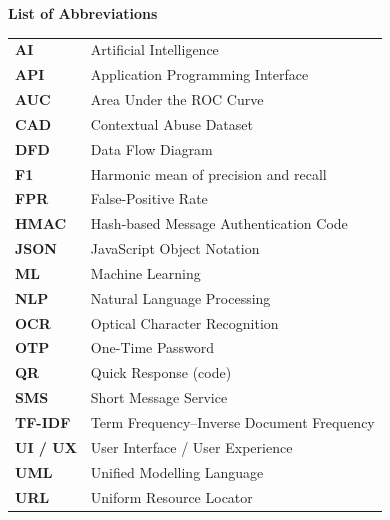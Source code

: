 \newpage
\thispagestyle{plain}
\begin{center}
\textbf {{\Large List of Abbreviations}} \\
\vspace{1pc}
\end{center}
\singlespacing
{\renewcommand{\arraystretch}{1.25}
\begin{tabular}{p{3cm} p{11cm}}
\textbf{AI} & Artificial Intelligence \\
\textbf{API} & Application Programming Interface \\
\textbf{AUC} & Area Under the ROC Curve \\
\textbf{CAD} & Contextual Abuse Dataset \\
\textbf{DFD} & Data Flow Diagram \\
\textbf{F1} & Harmonic mean of precision and recall \\
\textbf{FPR} & False-Positive Rate \\
\textbf{HMAC} & Hash-based Message Authentication Code \\
\textbf{JSON} & JavaScript Object Notation \\
\textbf{ML} & Machine Learning \\
\textbf{NLP} & Natural Language Processing \\
\textbf{OCR} & Optical Character Recognition \\
\textbf{OTP} & One-Time Password \\
\textbf{QR} & Quick Response (code) \\
\textbf{SMS} & Short Message Service \\
\textbf{TF-IDF} & Term Frequency--Inverse Document Frequency \\
\textbf{UI / UX} & User Interface / User Experience \\
\textbf{UML} & Unified Modelling Language \\
\textbf{URL} & Uniform Resource Locator \\
\end{tabular}}
